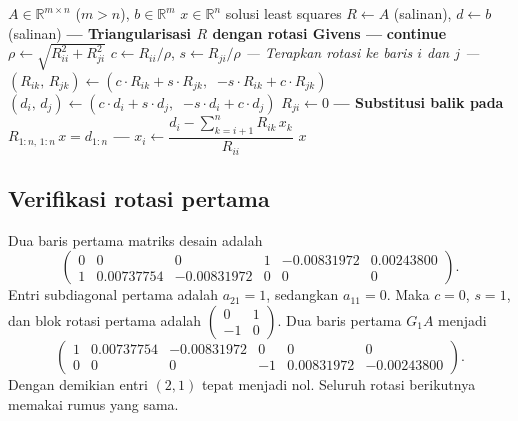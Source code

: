 \documentclass[11pt,a4paper]{article}
\newcommand{\R}{\mathbb{R}}
\begin{document}
\begin{algorithm}[H]
\caption{Penyelesaian Least Squares via QR Rotasi Givens}
\begin{algorithmic}[1]
\Require $A\in\R^{m\times n}$ ($m > n$), $b\in\R^m$
\Ensure $x\in\R^n$ solusi least squares
\State $R \gets A$ (salinan), \; $d \gets b$ (salinan)
\Statex \textbf{--- Triangularisasi $R$ dengan rotasi Givens ---}
 
     
            \State \textbf{continue} 
        \EndIf
        \State $\rho \gets \sqrt{R_{ii}^2 + R_{ji}^2}$
        \State $c \gets R_{ii} / \rho$, \;\; $s \gets R_{ji} / \rho$
        \Statex \hspace{2.5em} \textit{--- Terapkan rotasi ke baris $i$ dan $j$ ---}
         
            \State $(R_{ik},\, R_{jk}) \gets (c \cdot R_{ik} + s \cdot R_{jk},\;\; {-s} \cdot R_{ik} + c \cdot R_{jk})$
        \EndFor
        \State $(d_i,\, d_j) \gets (c \cdot d_i + s \cdot d_j,\;\; {-s} \cdot d_i + c \cdot d_j)$ 
        \State $R_{ji} \gets 0$
    \EndFor
\EndFor
\Statex \textbf{--- Substitusi balik pada $R_{1:n,\,1:n}\, x = d_{1:n}$ ---}
    \State $x_i \gets \dfrac{d_i - \sum_{k=i+1}^{n} R_{ik}\, x_k}{R_{ii}}$
\EndFor
\State \Return $x$
\end{algorithmic}
\end{algorithm}

\subsection*{Verifikasi rotasi pertama}
Dua baris pertama matriks desain adalah
\[
\begin{pmatrix}
0&0&0&1&-0.00831972&0.00243800\\
1&0.00737754&-0.00831972&0&0&0
\end{pmatrix}.
\]
Entri subdiagonal pertama adalah $a_{21}=1$, sedangkan $a_{11}=0$. Maka $c=0$, $s=1$, dan blok rotasi pertama adalah $\left(\begin{smallmatrix}0&1\\-1&0\end{smallmatrix}\right)$. Dua baris pertama $G_1A$ menjadi
\[
\begin{pmatrix}
1&0.00737754&-0.00831972&0&0&0\\
0&0&0&-1&0.00831972&-0.00243800
\end{pmatrix}.
\]
Dengan demikian entri $(2,1)$ tepat menjadi nol. Seluruh rotasi berikutnya memakai rumus yang sama.
\end{document}
